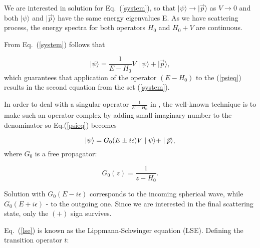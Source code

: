     We are interested in solution for Eq.~(\ref{system}), so that 
    $\mid \psi \rangle \rightarrow \mid \vec{p} \rangle$ as $V \rightarrow 0$
    and both $\mid \psi \rangle$ and $\mid \vec{p} \rangle$ have the same energy eigenvalues E.
    As we have scattering process, the energy spectra for both operators $H_0$ and $H_0 + V$
    are continuous. 

    From Eq.~(\ref{system}) follows that

    \begin{equation}
        \mid \psi \rangle = \frac{1}{E - H_0}V \mid \psi \rangle +  \mid \vec{p} \rangle,
        \label{psieq}
    \end{equation}
    which guarantees that
     application of the operator $(E -H_0)$ to the 
    (\ref{psieq}) results in the second equation from the set (\ref{system}).


    In order to deal with a singular operator $\frac{1}{E - H_0}$ in , the well-known
    technique is to make such an operator complex by adding small imaginary number to the denominator
    so Eq.(\ref{psieq}) becomes

    \begin{equation}
        \ket{\psi} = G_0(E \pm i\epsilon)V \mid \psi \rangle +  \mid \vec{p} \rangle,
        \label{lse}
    \end{equation}
    where $G_0$ is a free propagator:

    \begin{equation}
        G_0(z) = \frac{1}{z - H_0}.
        \label{g0}
    \end{equation}

    Solution with $G_0(E - i\epsilon)$ corresponds to the incoming spherical wave,
    while $G_0(E + i\epsilon)$ - to the outgoing one. Since we are interested in the final scattering
    state, only the $(+)$ sign survives.
    
    Eq.~(\ref{lse}) is known as the Lippmann-Schwinger equation (LSE).
    Defining the transition operator $t$:

